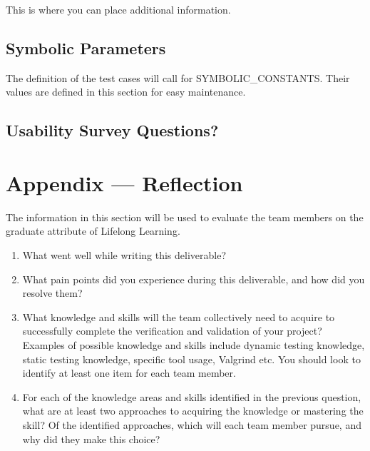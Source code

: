 \documentclass[12pt, titlepage]{article}
\begin{document}
This is where you can place additional information.

\subsection{Symbolic Parameters}

The definition of the test cases will call for SYMBOLIC\_CONSTANTS.
Their values are defined in this section for easy maintenance.

\subsection{Usability Survey Questions?}


\newpage{}
\section*{Appendix --- Reflection}


The information in this section will be used to evaluate the team members on the
graduate attribute of Lifelong Learning.



\begin{enumerate}
  \item What went well while writing this deliverable? 
  \item What pain points did you experience during this deliverable, and how
    did you resolve them?
  \item What knowledge and skills will the team collectively need to acquire to
  successfully complete the verification and validation of your project?
  Examples of possible knowledge and skills include dynamic testing knowledge,
  static testing knowledge, specific tool usage, Valgrind etc.  You should look to
  identify at least one item for each team member.
  \item For each of the knowledge areas and skills identified in the previous
  question, what are at least two approaches to acquiring the knowledge or
  mastering the skill?  Of the identified approaches, which will each team
  member pursue, and why did they make this choice?
\end{enumerate}
\end{document}
